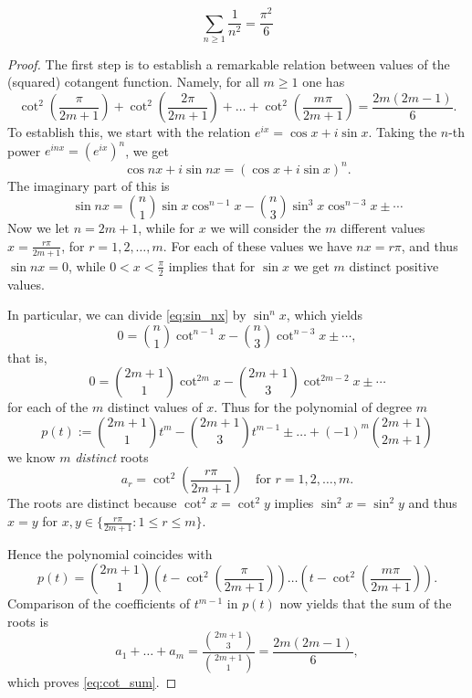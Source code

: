 \begin{theorem}
  \label{euler_series_3}
  \leanok
  \[
  \sum_{n\ge 1}\frac{1}{n^2} = \frac{\pi^2}{6}
  \]
\end{theorem}
\begin{proof}
  The first step is to establish a remarkable relation between values of the (squared) cotangent function.
  Namely, for all $m \ge 1$ one has
  \begin{equation} \label{eq:cot_sum}
  \cot^2 \left(\frac{\pi}{2m+1}\right) + \cot^2 \left(\frac{2\pi}{2m+1}\right) + \dots + \cot^2 \left(\frac{m\pi}{2m+1}\right) = \frac{2m(2m-1)}{6}.
  \end{equation}
  To establish this, we start with the relation $e^{ix} = \cos x + i \sin x$.
  Taking the $n$-th power $e^{inx} = (e^{ix})^n$, we get
  \[
  \cos nx + i \sin nx = (\cos x + i \sin x)^n.
  \]
  The imaginary part of this is
  \begin{equation} \label{eq:sin_nx}
  \sin nx = \binom{n}{1} \sin x \cos^{n-1} x - \binom{n}{3} \sin^3 x \cos^{n-3} x \pm \cdots
  \end{equation}
  Now we let $n = 2m+1$, while for $x$ we will consider the $m$ different values $x = \frac{r\pi}{2m+1}$, for $r = 1, 2, \dots, m$.
  For each of these values we have $nx = r\pi$, and thus $\sin nx = 0$, while $0 < x < \frac{\pi}{2}$ implies that for $\sin x$ we get $m$ distinct positive values.
  
  In particular, we can divide \eqref{eq:sin_nx} by $\sin^n x$, which yields
  \[
  0 = \binom{n}{1} \cot^{n-1} x - \binom{n}{3} \cot^{n-3} x \pm \cdots,
  \]
  that is,
  \[
  0 = \binom{2m+1}{1} \cot^{2m} x - \binom{2m+1}{3} \cot^{2m-2} x \pm \cdots
  \]
  for each of the $m$ distinct values of $x$.
  Thus for the polynomial of degree $m$
  \[
  p(t) := \binom{2m+1}{1} t^m - \binom{2m+1}{3} t^{m-1} \pm \dots + (-1)^m \binom{2m+1}{2m+1}
  \]
  we know $m$ \emph{distinct} roots
  \[
  a_r = \cot^2 \left(\frac{r\pi}{2m+1}\right) \quad \text{for } r = 1, 2, \dots, m.
  \]
  The roots are distinct because $\cot^2 x = \cot^2 y$ implies $\sin^2 x = \sin^2 y$
  and thus $x = y$ for $x, y \in \{ \frac{r\pi}{2m+1} : 1 \le r \le m \}$.
  
  Hence the polynomial coincides with
  \[
  p(t) = \binom{2m+1}{1} \left(t - \cot^2 \left(\frac{\pi}{2m+1}\right) \right) \dots \left(t - \cot^2 \left(\frac{m\pi}{2m+1}\right) \right).
  \]
  Comparison of the coefficients of $t^{m-1}$ in $p(t)$ now yields that the sum of the roots is
  \[
  a_1 + \dots + a_m = \frac{\binom{2m+1}{3}}{\binom{2m+1}{1}} = \frac{2m(2m-1)}{6},
  \]
  which proves \eqref{eq:cot_sum}.
  

\end{proof}
